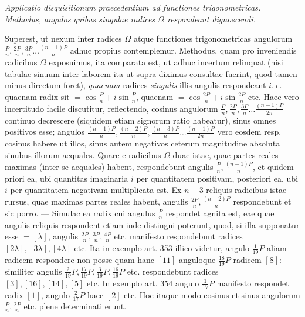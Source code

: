 \begin{center}\itshape \textit{Applicatio disquisitionum praecedentium ad functiones trigonometricas.}\\\textit{Methodus, angulos quibus singulae radices \(\Omega\) respondeant dignoscendi.}\end{center}


Superest, ut nexum inter radices \(\Omega\) atque functiones trigonometricas angulorum \(\frac Pn,\allowbreak \frac{2P}n,\allowbreak \frac{3P}n\ldots\frac{(n-1)P}n\) adhuc propius contemplemur. Methodus, quam pro inveniendis radicibus \(\Omega\) exposuimus, ita comparata est, ut adhuc incertum relinquat (nisi tabulae sinuum inter laborem ita ut supra diximus consultae fuerint, quod tamen minus directum foret), \textit{quaenam} radices \textit{singulis} illis angulis respondeant \(i.\ e.\) quaenam radix sit \(=\cos\frac Pn+i\sin\frac Pn\), quaenam \(=\cos\frac{2P}n+i\sin\frac{2P}n\) etc. Haec vero incertitudo facile discutitur, reflectendo, cosinus angulorum \(\frac Pn,\allowbreak \frac{2P}n,\allowbreak \frac{3P}n\ldots\frac{(n-1)P}{2n}\) continuo decrescere (siquidem etiam signorum ratio habeatur), sinus omnes positivos esse; angulos \(\frac{(n-1)P}n,\allowbreak \frac{(n-2)P}n,\allowbreak \frac{(n-3)P}n\ldots\frac{(n+1)P}{2n}\) vero eosdem resp. cosinus habere ut illos, sinus autem negativos ceterum magnitudine absoluta sinubus illorum aequales. Quare e radicibus \(\Omega\) duae istae, quae partes reales maximas (inter se aequales) habent, respondebunt angulis \(\frac Pn,\allowbreak \frac{(n-1)P}n\), et quidem priori ea, ubi quantitas imaginaria \(i\) per quantitatem positivam, posteriori ea, ubi \(i\) per quantitatem negativam multiplicata est. Ex \(n-3\) reliquis radicibus istae rursus, quae maximas partes reales habent, angulis \(\frac{2P}n,\allowbreak \frac{(n-2)P}n\) respondebunt et sic porro. — Simulac ea radix cui angulus \(\frac Pn\) respondet agnita est, eae quae angulis reliquis respondent etiam inde distingui poterunt, quod, si illa supponatur esse \(=[\lambda]\), angulis \(\frac{2P}n,\allowbreak \frac{3P}n,\allowbreak \frac{4P}n\) etc. manifesto respondebunt radices \([2\lambda],\allowbreak [3\lambda],\allowbreak [4\lambda]\) etc. Ita in exemplo art. 353 illico videtur, angulo \(\frac1{19}P\) aliam radicem respondere non posse quam hanc \([11]\) anguloque \(\frac{18}{19}P\) radicem \([8]\): similiter angulis \(\frac2{19}P,\allowbreak \frac{17}{19}P,\allowbreak \frac3{19}P,\allowbreak \frac{16}{19}P\) etc. respondebunt radices \([3],\allowbreak [16],\allowbreak [14],\allowbreak [5]\) etc. In exemplo art. 354 angulo \(\frac1{17}P\) manifesto respondet radix \([1]\), angulo \(\frac2{17}P\) haec \([2]\) etc. Hoc itaque modo cosinus et sinus angulorum \(\frac Pn,\allowbreak \frac{2P}n\) etc. plene determinati erunt.


